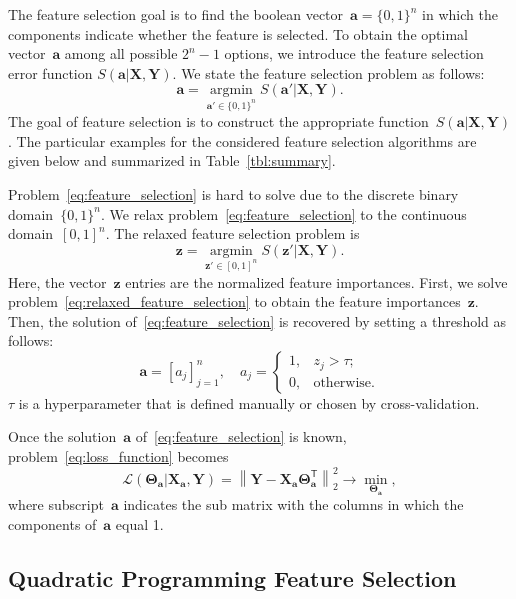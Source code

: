 \documentclass[preprint,authoryear,12pt]{elsarticle}
\theoremstyle{definition}
\newcommand{\ba}{\mathbf{a}}
\newcommand{\bz}{\mathbf{z}}
\newcommand{\bY}{\mathbf{Y}}
\newcommand{\bX}{\mathbf{X}}
\newcommand{\T}{\mathsf{T}}
\newcommand{\bTheta}{\boldsymbol{\Theta}}
\newcommand{\argmin}{\mathop{\arg \min}\limits}
\begin{document}
The feature selection goal is to find the boolean vector~$\ba = \{0, 1\}^n$ in which the components indicate whether the feature is selected. 
To obtain the optimal vector~$\ba$ among all possible $2^n - 1$ options, we introduce the feature selection error function $S(\ba | \bX, \bY)$. 
We state the feature selection problem as follows:
\begin{equation}
\ba = \argmin_{\ba' \in \{0, 1\}^n} S(\ba' | \bX, \bY).
\label{eq:feature_selection}
\end{equation}
The goal of feature selection is to construct the appropriate function~$S(\ba | \bX, \bY)$. The particular examples for the considered feature selection algorithms are given below and summarized in Table~\ref{tbl:summary}.

Problem~\eqref{eq:feature_selection} is hard to solve due to the discrete binary domain~$\{0, 1\}^n$. We relax problem~\eqref{eq:feature_selection} to the continuous domain~$[0, 1]^n$. The relaxed feature selection problem is
\begin{equation}
\bz = \argmin_{\bz' \in [0, 1]^n} S(\bz' | \bX, \bY).
\label{eq:relaxed_feature_selection}
\end{equation}
Here, the vector~$\bz$ entries are the normalized feature importances.
First, we solve problem~\eqref{eq:relaxed_feature_selection} to obtain the feature importances~$\bz$. 
Then, the solution of~\eqref{eq:feature_selection} is recovered by setting a threshold as follows:
\begin{equation*}
\ba = [a_j]_{j=1}^n, \quad 
a_j = \begin{cases}
1, & z_j > \tau; \\
0, & \text{otherwise}.
\end{cases}
\end{equation*}
$\tau$ is a hyperparameter that is defined manually or chosen by cross-validation. 

Once the solution~$\ba$ of~\eqref{eq:feature_selection} is known, problem~\eqref{eq:loss_function} becomes
\begin{equation*}
\mathcal{L}(\bTheta_{\ba} | \bX_{\ba}, \bY) = {\left\| \mathbf{Y} - \bX_{\ba}\bTheta^{\T}_{\ba} \right\| }_2^2 \rightarrow\min_{\bTheta_{\ba}},
\end{equation*}
where subscript~$\ba$ indicates the sub matrix with the columns in which the components of~$\ba$ equal 1.

\subsection{Quadratic Programming Feature Selection}
\end{document}
